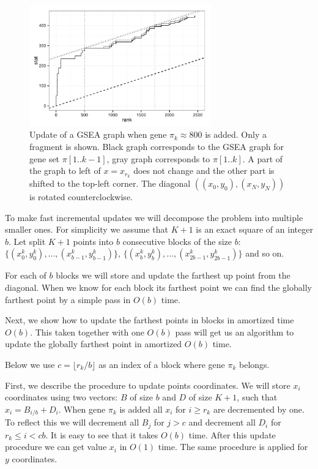 \documentclass[runningheads,a4paper]{llncs}
\begin{document}
\begin{figure}[h]
\begin{center}
\includegraphics[width=0.7\textwidth]{gsea_update.pdf}
\end{center}
\caption{
    Update of a GSEA graph when gene $\pi_k \approx 800$ is 
    added. Only a fragment is shown. Black graph corresponds
    to the GSEA graph for gene set $\pi[1..k-1]$, 
    gray graph corresponds to $\pi[1..k]$.
    A part of the graph to left of $x=x_{r_k}$ does not change and 
    the other part is shifted to the top-left corner. The diagonal
    $\left((x_0, y_0), (x_N, y_N)\right)$ is rotated
    counterclockwise.
  }\label{fig_gsea_update}
\end{figure}

To make fast incremental updates we will decompose the problem into
multiple smaller ones. For simplicity we assume that $K+1$ is an exact
square of an integer $b$. Let split $K+1$ points into $b$ consecutive 
blocks of the size $b$: 
$\{(x^k_0, y^k_0), ..., (x^k_{b-1}, y^k_{b-1})\}$,
$\{(x^k_b, y^k_b), ..., (x^k_{2b-1}, y^k_{2b-1})\}$ and so on.

For each of $b$ blocks we will store and update the farthest up point
from the diagonal. When we know for each block its farthest point
we can find the globally farthest point by a simple pass in $O(b)$ time.

Next, we show how to update the farthest points in blocks in amortized time
$O(b)$. This taken together with one $O(b)$ pass will get us an algorithm
to update the globally farthest point in amortized $O(b)$ time.

Below we use $c = \lfloor r_k / b \rfloor$ as an index of a block where gene
$\pi_k$ belongs.

First, we describe the procedure to update points coordinates. 
We will store $x_i$ coordinates using two vectors: $B$ of size $b$
and $D$ of size $K + 1$, such that $x_i = B_{i / b} + D_i$.
When gene $\pi_k$ is added all $x_i$ for $i \ge r_k$ are decremented by one.
To reflect this we will decrement all $B_j$ for $j > c$ and decrement
all $D_i$ for $r_k \le i < cb$. It is easy to see that it takes $O(b)$ 
time. After this update procedure we can get value $x_i$ in $O(1)$ time.
The same procedure is applied for $y$ coordinates.
\end{document}
